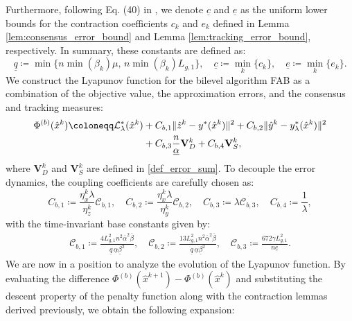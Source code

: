 \documentclass{article}
\theoremstyle{plain}
\theoremstyle{definition}
\theoremstyle{remark}
\begin{document}
Furthermore, following Eq. (40) in \cite{Nedic2025tvd}, we denote $\underline{c}$ and $\underline{e}$ as the uniform lower bounds for the contraction coefficients $c_{k}$ and $e_{k}$ defined in Lemma \ref{lem:consensus_error_bound} and Lemma \ref{lem:tracking_error_bound}, respectively. In summary, these constants are defined as:
\begin{equation}\label{eq:constants_summary}
    \underline{q} \coloneqq \min\big\{ n \min(\beta_{k})\mu, \, n \min(\beta_{k})L_{g,1} \big\}, \quad 
    \underline{c} \coloneqq \min_{k} \{c_{k}\}, \quad 
    \underline{e} \coloneqq \min_{k} \{e_{k}\}.
\end{equation}
We construct the Lyapunov function for the bilevel algorithm FAB as a combination of the objective value, the approximation errors, and the consensus and tracking measures:
\begin{align}\label{eq:Lyapunov_def}
    \Phi^{(b)}({\hat{x}}^k) \coloneqq \mathcal{L}_{\lambda}^*({\hat{x}}^k) &+ C_{b,1} \|{\hat{z}}^k-y^*({\hat{x}}^k)\|^2 + C_{b,2} \|{\hat{y}}^k-y_\lambda^*({\hat{x}}^k)\|^2 \notag \\
    &+ C_{b,3} \frac{n}{\underline{\alpha}}\mathbf{V}_{D}^{k} + C_{b,4} \mathbf{V}_{S}^{k},
\end{align}
where $\mathbf{V}_{D}^{k}$ and $\mathbf{V}_{S}^{k}$ are defined in \eqref{def_error_sum}. To decouple the error dynamics, the coupling coefficients are carefully chosen as:
\begin{equation}\label{eq:coefficients_def}
    C_{b,1} \coloneqq \frac{\eta_{x}^{k}\lambda}{\eta_{z}^{k}}\mathcal{C}_{b,1}, \quad
    C_{b,2} \coloneqq \frac{\eta_{x}^{k}\lambda}{\eta_{y}^{k}} \mathcal{C}_{b,2}, \quad
    C_{b,3} \coloneqq \lambda \mathcal{C}_{b,3}, \quad
    C_{b,4} \coloneqq \frac{1}{\lambda},
\end{equation}
with the time-invariant base constants given by:
\begin{align}\label{eq:aux_constants}
   \mathcal{C}_{b,1} \coloneqq \frac{4 L_{g,1}^{2} n^2 \overline{\alpha}^{2} \overline{\beta}}{\underline{q}\,\underline{\alpha}\underline{\beta}^2}, \quad
    \mathcal{C}_{b,2} \coloneqq \frac{13 L_{g,1}^{2} n^2 \overline{\alpha}^{2} \overline{\beta} }{\underline{q}\,\underline{\alpha}\underline{\beta}^2}, \quad
    \mathcal{C}_{b,3} \coloneqq \frac{672\gamma L_{g,1}^{2}}{n\underline{e}}.
\end{align}
We are now in a position to analyze the evolution of the Lyapunov function. By evaluating the difference $\Phi^{(b)}({\hat{x}}^{k+1}) - \Phi^{(b)}({\hat{x}}^{k})$ and substituting the descent property of the penalty function along with the contraction lemmas derived previously, we obtain the following expansion:
\end{document}
